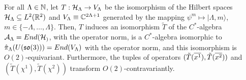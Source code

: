 \begin{theorem}\label{theoremUso3ViewAlternativeAlgebraO2IsomorphismD2}
For all $\Lambda \in \mathbb{N}$, let $T: \mathcal H_\Lambda \to V_\Lambda$ be the isomorphism of the Hilbert spaces $\mathcal H_\Lambda \subseteq L^2(\mathbb{R}^2)$ and $V_\Lambda \equiv \mathbb{C}^{2\Lambda + 1}$ generated by the mapping $\psi^m \mapsto |\Lambda, m\rangle$, $m \in \{-\Lambda, \dots, \Lambda\}$. Then, $T$ induces an isomorphism $\tilde T$ of the $C^*$-algebra $\mathcal A_\Lambda = End(\mathcal H_)$, with the operator norm, is a $C^*$-algebra isomorphic to $\hat \pi_\Lambda(U(\mathfrak{so}(3))) = End(V_\Lambda)$ with the operator norm, and this isomorphism is $O(2)$-equivariant. Furthermore, the tuples of operators $(\tilde T(\overline{x^1}), \tilde T(\overline{x^2}))$ and $(\tilde T(\chi^1), \tilde T(\chi^2))$ transform $O(2)$-contravariantly.
\end{theorem}
